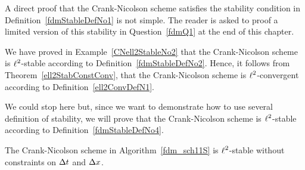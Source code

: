 A direct proof that the Crank-Nicolson scheme satisfies the stability
condition in Definition~\ref{fdmStableDefNo1} is not simple.
The reader is asked to proof a limited version of this stability in
Question~\ref{fdmQ1} at the end of this chapter.

We have proved in Example~\ref{CNell2StableNo2} that the
Crank-Nicolson scheme is $\displaystyle \ell^2$-stable according to
Definition~\ref{fdmStableDefNo2}.  Hence, it follows from
Theorem~\ref{ell2StabConstConv}, that the Crank-Nicolson scheme is
$\displaystyle \ell^2$-convergent according to Definition~\ref{ell2ConvDefN1}.

We could stop here but, since we want to demonstrate how to use
several definition of stability, we will prove that the Crank-Nicolson
scheme is $\displaystyle \ell^2$-stable according to
Definition~\ref{fdmStableDefNo4}.

\begin{prop}
The Crank-Nicolson scheme in Algorithm~\ref{fdm_sch11S} is
$\displaystyle \ell^2$-stable without constraints on $\Delta{t}$ and $\Delta{x}$.
\end{prop}

